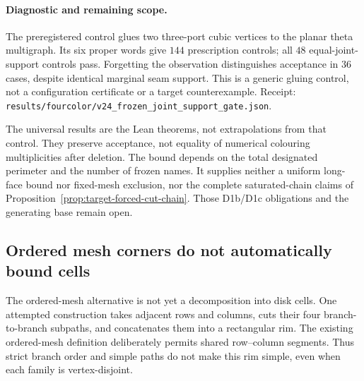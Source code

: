 \paragraph{Diagnostic and remaining scope.}
The preregistered control glues two three-port cubic vertices to the planar
theta multigraph. Its six proper words give $144$ prescription controls;
all $48$ equal-joint-support controls pass. Forgetting the observation
distinguishes acceptance in $36$ cases, despite identical marginal seam
support. This is a generic gluing control, not a configuration certificate
or a target counterexample. Receipt:
\texttt{results/fourcolor/v24\_frozen\_joint\_support\_gate.json}.

The universal results are the Lean theorems, not extrapolations from that
control. They preserve acceptance, not equality of numerical colouring
multiplicities after deletion. The bound depends on the total designated
perimeter and the number of frozen names. It supplies neither a uniform
long-face bound nor fixed-mesh exclusion, nor the complete saturated-chain
claims of Proposition~\ref{prop:target-forced-cut-chain}. Those D1b/D1c
obligations and the generating base remain open.

\subsection{Ordered mesh corners do not automatically bound cells}
\label{sec:ordered-mesh-cell-obstruction}

The ordered-mesh alternative is not yet a decomposition into disk cells.
One attempted construction takes adjacent rows and columns, cuts their
four branch-to-branch subpaths, and concatenates them into a rectangular
rim. The existing ordered-mesh definition deliberately permits shared
row--column segments. Thus strict branch order and simple paths do not
make this rim simple, even when each family is vertex-disjoint.

